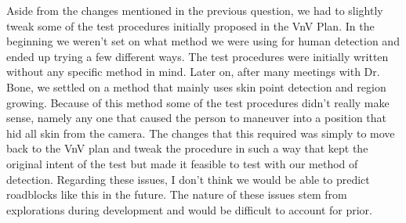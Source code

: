 \documentclass[12pt, titlepage]{article}
\begin{document}
\begin{enumerate}
  Aside from the changes mentioned in the previous question, we had to slightly tweak some of the test procedures initially proposed in the VnV Plan. In the beginning we weren't set on what method we were using for human detection and ended up trying a few different ways. The test procedures were initially written without any specific method in mind. Later on, after many meetings with Dr. Bone, we settled on a method that mainly uses skin point detection and region growing. Because of this method some of the test procedures didn't really make sense, namely any one that caused the person to maneuver into a position that hid all skin from the camera. The changes that this required was simply to move back to the VnV plan and tweak the procedure in such a way that kept the original intent of the test but made it feasible to test with our method of detection. Regarding these issues, I don't think we would be able to predict roadblocks like this in the future. The nature of these issues stem from explorations during development and would be difficult to account for prior.
\end{enumerate}
\end{document}
